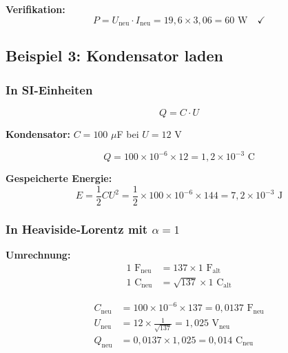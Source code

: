 	\textbf{Verifikation:}
	\begin{equation}
		P = U_{\text{neu}} \cdot I_{\text{neu}} = 19{,}6 \times 3{,}06 = 60 \text{ W} \quad \checkmark
	\end{equation}
	
	\subsection{Beispiel 3: Kondensator laden}
	
	\subsubsection{In SI-Einheiten}
	
	\begin{equation}
		Q = C \cdot U
	\end{equation}
	
	\textbf{Kondensator:} $C = 100$ $\mu$F bei $U = 12$ V
	
	\begin{equation}
		Q = 100 \times 10^{-6} \times 12 = 1{,}2 \times 10^{-3} \text{ C}
	\end{equation}
	
	\textbf{Gespeicherte Energie:}
	\begin{equation}
		E = \frac{1}{2} C U^2 = \frac{1}{2} \times 100 \times 10^{-6} \times 144 = 7{,}2 \times 10^{-3} \text{ J}
	\end{equation}
	
	\subsubsection{In Heaviside-Lorentz mit $\alpha = 1$}
	
	\textbf{Umrechnung:}
	\begin{align}
		1 \text{ F}_{\text{neu}} &= 137 \times 1 \text{ F}_{\text{alt}} \\
		1 \text{ C}_{\text{neu}} &= \sqrt{137} \times 1 \text{ C}_{\text{alt}}
	\end{align}
	
	\begin{align}
		C_{\text{neu}} &= 100 \times 10^{-6} \times 137 = 0{,}0137 \text{ F}_{\text{neu}} \\
		U_{\text{neu}} &= 12 \times \frac{1}{\sqrt{137}} = 1{,}025 \text{ V}_{\text{neu}} \\
		Q_{\text{neu}} &= 0{,}0137 \times 1{,}025 = 0{,}014 \text{ C}_{\text{neu}}
	\end{align}
	

